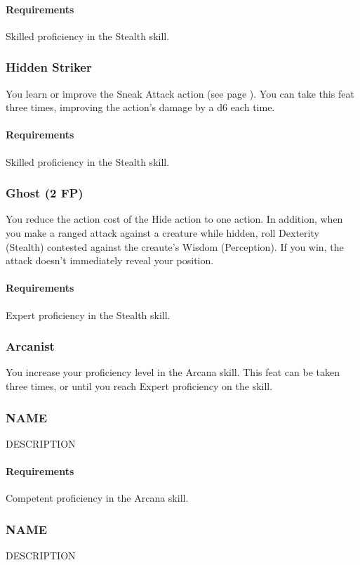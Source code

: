     \paragraph{Requirements} Skilled proficiency in the Stealth skill.
\subsubsection{Hidden Striker} \label{feat::hiddenstriker}
    You learn or improve the Sneak Attack action (see page \pageref{act:sneakattack}).
    You can take this feat three times, improving the action's damage by a d6 each time.
    \paragraph{Requirements} Skilled proficiency in the Stealth skill.
\subsubsection{Ghost (2 FP)} \label{feat::ghost}
    You reduce the action cost of the Hide action to one action.
    In addition, when you make a ranged attack against a creature while hidden, roll Dexterity (Stealth) contested against the creaute's Wisdom (Perception).
    If you win, the attack doesn't immediately reveal your position.
    \paragraph{Requirements} Expert proficiency in the Stealth skill.
\subsubsection{Arcanist} \label{feat::arcanist}
    You increase your proficiency level in the Arcana skill.
    This feat can be taken three times, or until you reach Expert proficiency on the skill.
\subsubsection{NAME} \label{feat::name}
    DESCRIPTION
    \paragraph{Requirements} Competent proficiency in the Arcana skill.
\subsubsection{NAME} \label{feat::name}
    DESCRIPTION
